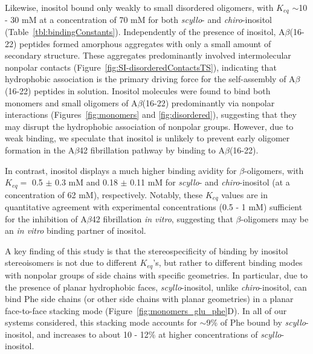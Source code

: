 Likewise, inositol bound only weakly to small disordered oligomers, with $K_{eq}$ $\sim$10 - 30 mM at a concentration of 70 mM for both \emph{scyllo}- and \emph{chiro}-inositol (Table~\ref{tbl:bindingConstants}). Independently of the presence of inositol,  A$\beta$(16-22) peptides formed amorphous aggregates with only a small amount of secondary structure. These aggregates predominantly involved intermolecular nonpolar contacts (Figure~\ref{fig:SI-disorderedContactsTS}), indicating that hydrophobic association is the primary driving force for the self-assembly of A$\beta$(16-22) peptides in solution. Inositol molecules were found to bind both monomers and small oligomers of A$\beta$(16-22) predominantly via nonpolar interactions (Figures~{\ref{fig:monomers}} and {\ref{fig:disordered}}),  suggesting that they may disrupt the hydrophobic association of nonpolar groups. However, due to weak binding, we speculate that inositol is unlikely to prevent early oligomer formation in the A$\beta$42 fibrillation pathway by binding to A$\beta$(16-22).

In contrast, inositol displays a much higher binding avidity for $\beta$-oligomers, with $K_{eq}=$ 0.5 $\pm$ 0.3 mM and  0.18 $\pm$ 0.11 mM for \emph{scyllo}- and \emph{chiro}-inositol (at a concentration of 62 mM), respectively. Notably, these $K_{eq}$ values are in quantitative agreement with experimental concentrations (0.5 - 1 mM) sufficient for the inhibition of A$\beta$42 fibrillation \emph{in vitro},\cite{McLaurin:2000p64} suggesting that $\beta$-oligomers may be an \emph{in vitro} binding partner of inositol.

A key finding of this study is that the stereospecificity of binding by inositol stereoisomers is not due to different $K_{eq}$'s, but rather to different binding modes with nonpolar groups of side chains with specific geometries. In particular, due to the presence of planar hydrophobic faces, \emph{scyllo}-inositol, unlike \emph{chiro}-inositol, can bind Phe side chains (or other side chains with planar geometries) in a planar face-to-face stacking mode (Figure~\ref{fig:monomers_glu_phe}D). In all of our systems considered, this stacking mode accounts for $\sim$9\% of Phe bound by \emph{scyllo}-inositol, and increases to about 10 - 12\% at higher concentrations of \emph{scyllo}-inositol.

